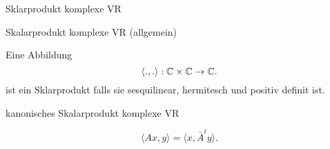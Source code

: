 \documentclass[class=article, crop=false]{standalone}
\begin{document}
\begin{zettel}{Sklarprodukt komplexe VR}
\begin{flashcard}[]{}
	\begin{question}
		Skalarprodukt komplexe VR (allgemein)
	\end{question}
	\begin{definition}
		Eine Abbildung
		\[
			\langle .,.\rangle : \mathbb{C} \times \mathbb{C} \to \mathbb{C}
		.\]
		ist ein Sklarprodukt falls sie sesquilinear, hermitesch und positiv definit ist.
	\end{definition}
\end{flashcard}

\begin{flashcard}[]{}
	\begin{question}
		kanonisches Skalarprodukt komplexe VR
	\end{question}
\end{flashcard}
\begin{remark}
	\[
		\langle Ax,y \rangle = \langle x,\bar{A}^{t}y\rangle
	.\]
\end{remark}
\end{zettel}
\end{document}

